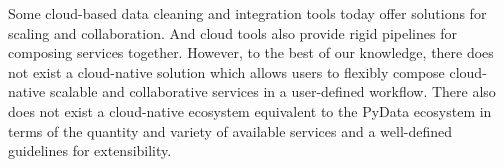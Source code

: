 Some cloud-based data cleaning and integration tools today offer solutions for scaling and collaboration. And cloud 
tools also provide rigid pipelines for composing services together. However, to the best of our knowledge, there does
not exist a cloud-native solution which allows users to flexibly compose cloud-native scalable and collaborative services 
in a user-defined workflow. There also does not exist a cloud-native ecosystem equivalent to the 
PyData ecosystem in terms of the quantity and variety of available services and a well-defined 
guidelines for extensibility. 
